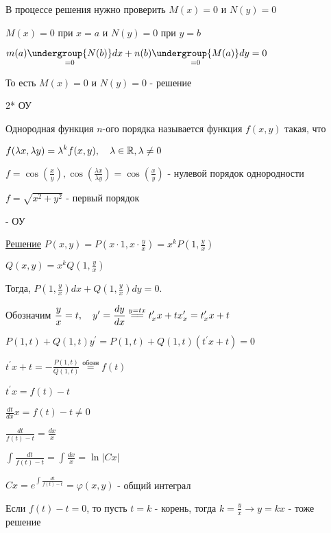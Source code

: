 \documentclass[12pt]{article}
\begin{document}
    \Nota В процессе решения нужно проверить $M(x) = 0$ и $N(y) = 0$

    $M(x) = 0$ при $x = a$ и $N(y) = 0$ при $y = b$

    $m(a)\underset{=0}{\undergroup{N(b)}}dx + n(b)\underset{=0}{\undergroup{M(a)}}dy = 0$

    То есть $M(x) = 0$ и $N(y) = 0$ - решение

    2* ОУ

     Однородная функция $n$-ого порядка называется функция $f(x, y)$ такая, что

    $\displaystyle f(\lambda x, \lambda y) = \lambda^k f(x, y), \quad \lambda \in \mathbb{R}, \lambda \neq 0$

    \Ex $\displaystyle f = \cos\left(\frac{x}{y}\right), \cos(\frac{\lambda x}{\lambda y}) = \cos(\frac{x}{y})$ - нулевой порядок однородности

    $\displaystyle f = \sqrt{x^2 + y^2}$ - первый порядок

      - ОУ

    \underline{Решение} $\displaystyle P(x, y) = P\left(x \cdot 1, x \cdot \frac{y}{x}\right) = x^k P\left(1, \frac{y}{x}\right)$

    $\displaystyle Q(x, y) = x^k Q\left(1, \frac{y}{x}\right)$

    Тогда, $\displaystyle P\left(1, \frac{y}{x}\right)dx + Q\left(1, \frac{y}{x}\right)dy = 0$.

    Обозначим $\displaystyle \frac{y}{x} = t, \quad y^\prime = \frac{dy}{dx} \stackrel{y = tx}{=\joinrel=} t^\prime_x x + t x^\prime_x = t^\prime_x x + t$

    $\displaystyle P(1, t) + Q(1, t)y^\prime = P(1, t) + Q(1, t)(t^\prime x + t) = 0$

    $\displaystyle t^\prime x + t = -\frac{P(1, t)}{Q(1, t)} \stackrel{\text{обозн}}{=} f(t)$

    $\displaystyle t^\prime x = f(t) - t$

    $\displaystyle \frac{dt}{dx}x = f(t) - t \neq 0$

    $\displaystyle \frac{dt}{f(t) - t} = \frac{dx}{x}$

    $\displaystyle \int\frac{dt}{f(t) - t} = \int\frac{dx}{x} = \ln|Cx|$

    $\displaystyle Cx = e^{\int\frac{dt}{f(t) - t}} = \varphi(x, y)$ - общий интеграл

    Если $f(t) - t = 0$, то пусть $t = k$ - корень, тогда $\displaystyle k = \frac{y}{x} \to y = kx$ - тоже решение
\end{document}
